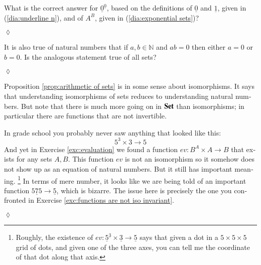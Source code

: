 \documentclass{book}
\def\NN{{\mathbb N}}
\def\to{\rightarrow}
\def\taking{\colon}
\def\too{\longrightarrow}
\def\ul{\underline}
\def\Set{{\bf Set}}
\theoremstyle{theoremENG}
\theoremstyle{lemmaENG}
\theoremstyle{propositionENG}
\theoremstyle{corollaryENG}
\theoremstyle{factENG}
\theoremstyle{remarkENG}
\theoremstyle{exampleENG}
\theoremstyle{warningENG}
\theoremstyle{questionENG}
\theoremstyle{guessENG}
\theoremstyle{answerENG}
\theoremstyle{constructionENG}
\theoremstyle{rulesENG}
\theoremstyle{excENG}
\newtheorem{excENG}[subsubsection]{\begin{english}Exercise\end{english}}
\theoremstyle{appENG}
\theoremstyle{definitionENG}
\theoremstyle{notationENG}
\theoremstyle{conjectureENG}
\theoremstyle{postulateENG}
\newenvironment{exerciseENG}{\begin{excENG}}{\hspace*{\fill}$\lozenge$\end{excENG}}
\theoremstyle{theoremRUS}
\theoremstyle{lemmaRUS}
\theoremstyle{propositionRUS}
\theoremstyle{corollaryRUS}
\theoremstyle{factRUS}
\theoremstyle{remarkRUS}
\theoremstyle{exampleRUS}
\theoremstyle{warningRUS}
\theoremstyle{questionRUS}
\theoremstyle{guessRUS}
\theoremstyle{answerRUS}
\theoremstyle{constructionRUS}
\theoremstyle{rulesRUS}
\theoremstyle{excRUS}
\theoremstyle{appRUS}
\theoremstyle{definitionRUS}
\theoremstyle{notationRUS}
\theoremstyle{conjectureRUS}
\theoremstyle{postulateRUS}
\begin{document}
\begin{english}
\begin{exerciseENG}
What is the correct answer for $\ul{0}^{\ul{0}}$, based on the definitions of $\ul{0}$ and $\ul{1}$, given in (\ref{dia:underline n}), and of $A^B$, given in (\ref{dia:exponential sets})?

\begin{russian} \end{russian}

\end{exerciseENG}

\begin{exerciseENG}

It is also true of natural numbers that if $a,b\in\NN$ and $ab=0$ then either $a=0$ or $b=0$. Is the analogous statement true of all sets?

\begin{russian} \end{russian}

\end{exerciseENG}

Proposition \ref{prop:arithmetic of sets} is in some sense about isomorphisms. It says that understanding isomorphisms of sets reduces to understanding natural numbers. But note that there is much more going on in $\Set$ than isomorphisms; in particular there are functions that are not invertible. 

\begin{russian} \end{russian}

In grade school you probably never saw anything that looked like this:
$$5^3\times 3\too 5$$
And yet in Exercise \ref{exc:evaluation} we found a function $ev\taking B^A\times A\to B$ that exists for any sets $A,B$. This function $ev$ is not an isomorphism so it somehow does not show up as an equation of natural numbers. But it still has important meaning.
\footnote{Roughly, the existence of $ev\taking\ul{5}^{\ul{3}}\times\ul{3}\too \ul{5}$ says that given a dot in a $5\times 5\times 5$ grid of dots, and given one of the three axes, you can tell me the coordinate of that dot along that axis.} In terms of mere number, it looks like we are being told of an important function $\ul{575}\to\ul{5}$, which is bizarre. The issue here is precisely the one you confronted in Exercise \ref{exc:functions are not iso invariant}.

\begin{russian} \end{russian}

\begin{exerciseENG}


\end{exerciseENG}
\end{english}
\end{document}
